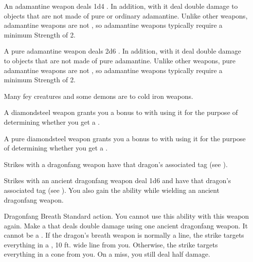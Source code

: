        An adamantine weapon deals 1d4 .
      In addition,  with it deal double damage to objects that are not made of pure or ordinary adamantine.
      Unlike other weapons, adamantine weapons are not , so  adamantine weapons typically require a minimum Strength of 2.

       A pure adamantine weapon deals 2d6 .
      In addition,  with it deal double damage to objects that are not made of pure adamantine.
      Unlike other weapons, pure adamantine weapons are not , so  adamantine weapons typically require a minimum Strength of 2.

       Many fey creatures and some demons are  to cold iron weapons.

       A diamondsteel weapon grants you a  bonus to  with  using it for the purpose of determining whether you get a .

       A pure diamondsteel weapon grants you a  bonus to  with  using it for the purpose of determining whether you get a .

       Strikes with a dragonfang weapon have that dragon's associated tag (see ).

       Strikes with an ancient dragonfang weapon deal 1d6  and have that dragon's associated tag (see ).
      You also gain the  ability while wielding an ancient dragonfang weapon.
      \begin{activeability}{Dragonfang Breath}
        \abilityusagetime Standard action.
        \abilitycost You  cannot use this ability with this weapon again.
        \rankline
        Make a  that deals double damage using one ancient dragonfang weapon.
        It cannot be a .
        If the dragon's breath weapon is normally a line, the strike targets everything in a \arealarge, 10 ft. wide line from you.
        Otherwise, the strike targets everything in a \areamed cone from you.
        On a miss, you still deal half damage.
      \end{activeability}

